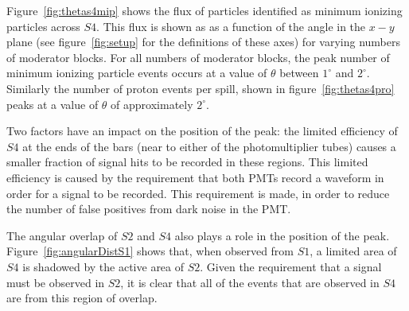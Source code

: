 
Figure~\ref{fig:thetas4mip} shows the flux of particles identified as minimum ionizing particles across $\mathit{S4}$.
This flux is shown as as a function of the angle in the $x-y$ plane (see figure~\ref{fig:setup} for the definitions of these axes) for varying numbers of moderator blocks.
For all numbers of moderator blocks, the peak number of minimum ionizing particle events occurs at a value of $\theta$ between $1^{\circ}$ and $2^{\circ}$.
Similarly the number of proton events per spill, shown in figure~\ref{fig:thetas4pro} peaks at a value of $\theta$ of approximately $2^{\circ}$.

Two factors have an impact on the position of the peak:
the limited efficiency of $\mathit{S4}$ at the ends of the bars (near to either of the photomultiplier tubes) causes a smaller fraction of signal hits to be recorded in these regions. 
This limited efficiency is caused by the requirement that both PMTs record a waveform in order for a signal to be recorded.
This requirement is made, in order to reduce the number of false positives from dark noise in the PMT.

The angular overlap of $\mathit{S2}$ and $\mathit{S4}$ also plays a role in the position of the peak. 
Figure~\ref{fig:angularDistS1} shows that, when observed from $\mathit{S1}$, a limited area of $\mathit{S4}$ is shadowed by the active area of $\mathit{S2}$.
Given the requirement that a signal must be observed in $\mathit{S2}$, it is clear that all of the events that are observed in $\mathit{S4}$ are from this region of overlap.

